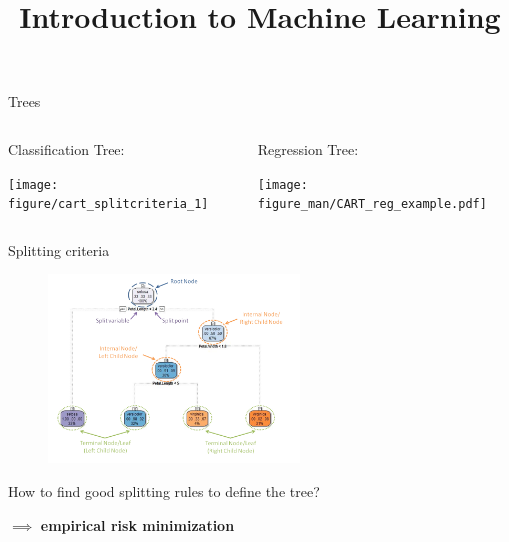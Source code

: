 \documentclass[11pt,compress,t,notes=noshow, xcolor=table]{beamer}
\title{Introduction to Machine Learning}
\institute{\href{https://compstat-lmu.github.io/lecture_i2ml/}{compstat-lmu.github.io/lecture\_i2ml}}
\date{}
\newenvironment{knitrout}{}{} %
\begin{document}
















\sloppy

\begin{frame}[fragile]{Trees}

\lz 

\begin{columns}
\begin{column}{0.5\textwidth}
Classification Tree:
\lz


\begin{knitrout}\scriptsize
{}\color{fgcolor}

{\centering \texttt{[image: figure/cart\_splitcriteria\_1]} 

}



\end{knitrout}
 
\end{column}
\begin{column}{0.5\textwidth}
Regression Tree:

\texttt{[image: figure\_man/CART\_reg\_example.pdf]}

\end{column}
\end{columns}
\end{frame}

\begin{frame}{Splitting criteria}

 \begin{figure}
    \centering
      \includegraphics[height = 5.0cm]{figure_man/labelling_of_tree.png}
    \end{figure}

How to find good splitting rules to define the tree?
\lz

$\implies$ \textbf{empirical risk minimization}

\end{frame}
\end{document}
